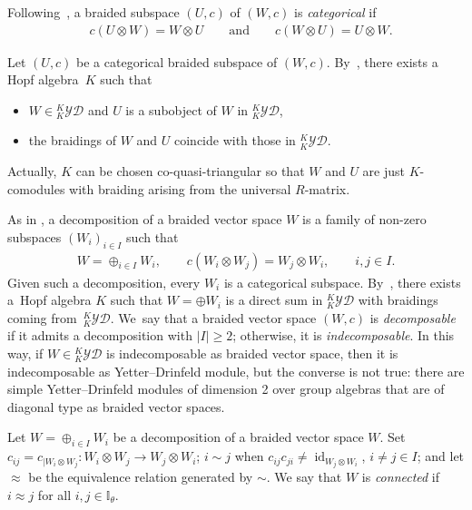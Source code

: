 \documentclass[10pt,a4paper]{amsart}
\numberwithin{equation}{section}
\newcommand{\id}{\operatorname{id}}
\newcommand{\I}{{\mathbb I}}
\newcommand{\yd}[1]{{}_{#1}^{#1}\mathcal{YD}}
\begin{document}
Following~\cite{T}, a braided subspace $(U,c)$ of $(W,c)$ is \emph{categorical} if
\begin{align*}%
&c(U \otimes W) = W \otimes U\qquad \text{and}\qquad c(W \otimes U) = U \otimes W.
\end{align*}

Let $(U,c)$ be a categorical braided subspace of $(W,c)$. By~\cite[Proposition~6.6]{T}, there
exists a Hopf al\-ge\-bra~$K$ such that
\begin{itemize}\itemsep=0pt
\item $W \in \yd{K}$ and $U$ is a subobject of $W$ in $\yd{K}$,
\item the braidings of $W$ and $U$ coincide with those in $\yd{K}$.
\end{itemize}
Actually, $K$ can be chosen co-quasi-triangular so that $W$ and $U$ are just $K$-comodules with braiding arising from the universal $R$-matrix.

As in \cite[Definition 2.1]{gr-jalg}, a decomposition of a braided vector space $W$ is a family of non-zero subspaces
$(W_i)_{i \in I}$ such that
\begin{align*}
W = \oplus_{i \in I} W_i,\qquad
c(W_i \otimes W_j) = W_j \otimes W_i,\qquad i,j\in I.
\end{align*}
Given such a decomposition, every $W_i$ is a categorical subspace. By~\cite[Proposition~6.6]{T}, there
exists a~Hopf algebra $K$ such that $W = \oplus W_i$ is a direct sum in $\yd{K}$ with braidings coming from~$\yd{K}$.
We~say that a braided vector space $(W,c)$ is \emph{decomposable} if it admits a decomposition
with $\vert I \vert \geq 2$; otherwise, it is \emph{indecomposable}.
In this way, if $W \in \yd{K}$ is indecomposable as braided vector space, then it is indecomposable as Yetter--Drinfeld module,
but the converse is not true: there are simple Yetter--Drinfeld modules of dimension 2 over group algebras
that are of diagonal type as braided vector spaces.

\begin{Definition}\label{def:connected}
Let $W = \oplus_{i \in I} W_i$ be a decomposition of a braided vector space $W$.
Set $c_{ij} = c_{\vert W_i \otimes W_j}\colon W_i \otimes W_j \to W_j \otimes W_i$;
$i \sim j$ when $c_{ij}c_{ji} \neq \id_{W_j \otimes W_i}$, $i \neq j \in I$; and
let $\approx$ be the equivalence relation generated by $\sim$. We say that $W$ is \emph{connected} if
$i \approx j$ for all $i, j \in \I_\theta$.
\end{Definition}
\end{document}
